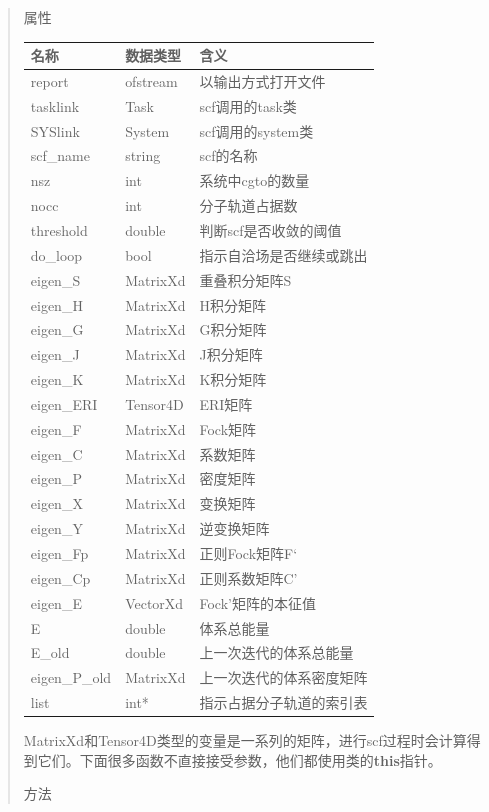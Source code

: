 \documentclass[11pt]{article}
\begin{document}
\begin{quote}
属性

\begin{longtable}[]{@{}lll@{}}
\toprule
名称 & 数据类型 & 含义\tabularnewline
\midrule
\endhead
report & ofstream & 以输出方式打开文件\tabularnewline
tasklink & Task & scf调用的task类\tabularnewline
SYSlink & System & scf调用的system类\tabularnewline
scf\_name & string & scf的名称\tabularnewline
nsz & int & 系统中cgto的数量\tabularnewline
nocc & int & 分子轨道占据数\tabularnewline
threshold & double & 判断scf是否收敛的阈值\tabularnewline
do\_loop & bool & 指示自洽场是否继续或跳出\tabularnewline
eigen\_S & MatrixXd & 重叠积分矩阵S\tabularnewline
eigen\_H & MatrixXd & H积分矩阵\tabularnewline
eigen\_G & MatrixXd & G积分矩阵\tabularnewline
eigen\_J & MatrixXd & J积分矩阵\tabularnewline
eigen\_K & MatrixXd & K积分矩阵\tabularnewline
eigen\_ERI & Tensor4D & ERI矩阵\tabularnewline
eigen\_F & MatrixXd & Fock矩阵\tabularnewline
eigen\_C & MatrixXd & 系数矩阵\tabularnewline
eigen\_P & MatrixXd & 密度矩阵\tabularnewline
eigen\_X & MatrixXd & 变换矩阵\tabularnewline
eigen\_Y & MatrixXd & 逆变换矩阵\tabularnewline
eigen\_Fp & MatrixXd & 正则Fock矩阵F`\tabularnewline
eigen\_Cp & MatrixXd & 正则系数矩阵C'\tabularnewline
eigen\_E & VectorXd & Fock'矩阵的本征值\tabularnewline
E & double & 体系总能量\tabularnewline
E\_old & double & 上一次迭代的体系总能量\tabularnewline
eigen\_P\_old & MatrixXd & 上一次迭代的体系密度矩阵\tabularnewline
list & int* & 指示占据分子轨道的索引表\tabularnewline
\bottomrule
\end{longtable}

MatrixXd和Tensor4D类型的变量是一系列的矩阵，进行scf过程时会计算得到它们。下面很多函数不直接接受参数，他们都使用类的\textbf{this}指针。

方法


\end{quote}
\end{document}
